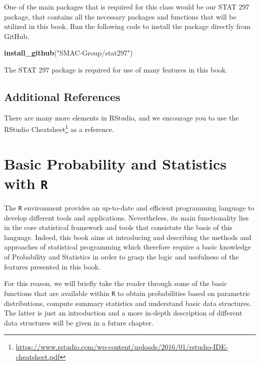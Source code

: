 \documentclass[12pt,]{krantz}
\newenvironment{Shaded}{\begin{snugshade}}{\end{snugshade}}
\newcommand{\KeywordTok}[1]{\textcolor[rgb]{0.27,0.27,0.27}{\textbf{#1}}}
\newcommand{\StringTok}[1]{\textcolor[rgb]{0.5,0.5,0.5}{#1}}
\newcommand{\NormalTok}[1]{#1}
\renewcommand{\href}[2]{#2\footnote{\url{#1}}}
\let\BeginKnitrBlock\begin \let\EndKnitrBlock\end
\begin{document}
One of the main packages that is required for this class would be our
STAT 297 package, that contains all the necessary packages and functions
that will be utilized in this book. Run the following code to install
the package directly from GitHub.

\begin{Shaded}
\begin{Highlighting}[]
\KeywordTok{install_github}\NormalTok{(}\StringTok{"SMAC-Group/stat297"}\NormalTok{)}
\end{Highlighting}
\end{Shaded}

\BeginKnitrBlock{rmdwarning}
The STAT 297 package is required for use of many features in this book.
\EndKnitrBlock{rmdwarning}

\subsection{Additional References}\label{additional-references}

There are many more elements in RStudio, and we encourage you to use the
\href{https://www.rstudio.com/wp-content/uploads/2016/01/rstudio-IDE-cheatsheet.pdf}{RStudio
Cheatsheet} as a reference.

\section{\texorpdfstring{Basic Probability and Statistics with
\texttt{R}}{Basic Probability and Statistics with R}}\label{basic-probability-and-statistics-with-r}

The \texttt{R} environment provides an up-to-date and efficient
programming language to develop different tools and applications.
Nevertheless, its main functionality lies in the core statistical
framework and tools that consistute the basis of this language. Indeed,
this book aims at introducing and describing the methods and approaches
of statistical programming which therefore require a basic knowledge of
Probability and Statistics in order to grasp the logic and usefulness of
the features presented in this book.

For this reason, we will briefly take the reader through some of the
basic functions that are available within \texttt{R} to obtain
probabilities based on parametric distributions, compute summary
statistics and understand basic data structures. The latter is just an
introduction and a more in-depth description of different data
structures will be given in a future chapter.
\end{document}
